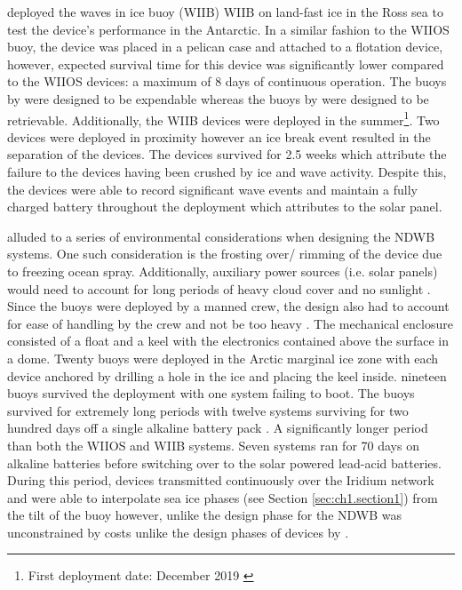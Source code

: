 \textcite{rabault2019open} deployed the waves in ice buoy (WIIB) WIIB on land-fast ice in the Ross sea \cite{rabault2020development} to test the device's performance in the Antarctic. In a similar fashion to the WIIOS buoy, the device was placed in a pelican case and attached to a flotation device, however, expected survival time for this device was significantly lower compared to the WIIOS devices: a maximum of 8 days \cite{rabault2019open} of continuous operation. The buoys by \textcite{kohout2015device} were designed to be expendable whereas the buoys by \textcite{rabault2019open} were designed to be retrievable. Additionally, the WIIB devices were deployed in the summer\footnote{First deployment date: December 2019 \cite{rabault2019open}}. Two devices were deployed in proximity however an ice break event resulted in the separation of the devices. The devices survived for 2.5 weeks \cite{rabault2019open} which \textcite{rabault2019open} attribute the failure to the devices having been crushed by ice and wave activity. Despite this, the devices were able to record significant wave events and maintain a fully charged battery throughout the deployment which \textcite{rabault2019open} attributes to the solar panel. 

\par \textcite{doble2017robust} alluded to a series of environmental considerations when designing the NDWB systems. One such consideration is the frosting over/ rimming of the device due to freezing ocean spray. Additionally, auxiliary power sources (i.e. solar panels) would need to account for long periods of heavy cloud cover and no sunlight \cite{doble2017robust,lever2006solar}. Since the buoys were deployed by a manned crew, the design also had to account for ease of handling by the crew and not be too heavy \cite{doble2017robust}. The mechanical enclosure consisted of a float and a keel with the electronics contained above the surface in a dome. Twenty buoys were deployed in the Arctic marginal ice zone with each device anchored by drilling a hole in the ice and placing the keel inside. nineteen buoys survived the deployment with one system failing to boot. The buoys survived for extremely long periods with twelve systems surviving for two hundred days off a single alkaline battery pack \cite{doble2017robust}. A significantly longer period than both the WIIOS and WIIB systems. Seven systems ran for 70 days on alkaline batteries before switching over to  the solar powered lead-acid batteries. During this period, devices transmitted continuously over the Iridium network and were able to interpolate sea ice phases (see Section \ref{sec:ch1.section1}) from the tilt of the buoy \cite{doble2017robust} however, unlike the design phase for the NDWB was unconstrained by costs unlike the design phases of devices by \textcite{rabault2019open,planck2019evolution,kohout2015device}. 

